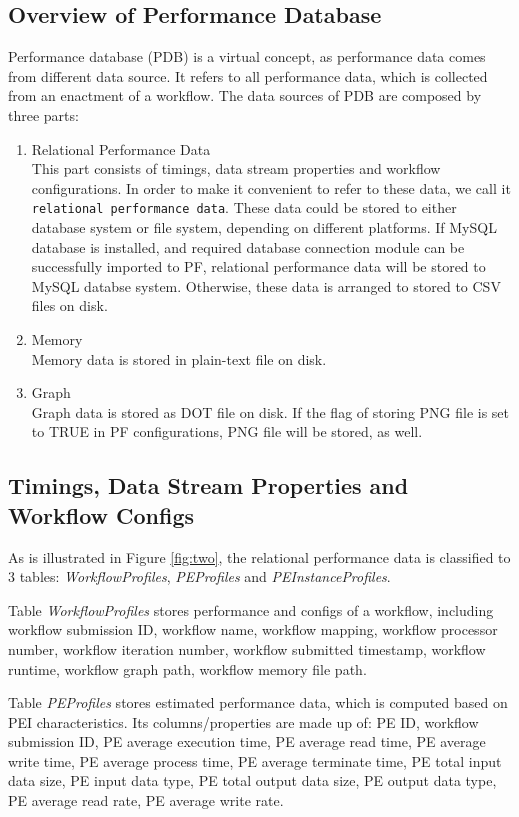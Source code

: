\documentclass[10pt,twoside,openright,logo]{report}
\begin{document}
\subsection{Overview of Performance Database}
Performance database (PDB) is a virtual concept, as performance data comes from different data source. It refers to all performance data, which is collected from an enactment of a workflow. The data sources of PDB are composed by three parts:
\begin{enumerate}
    \item Relational Performance Data\\
    This part consists of timings, data stream properties and workflow configurations. In order to make it convenient to refer to these data, we call it \texttt{relational performance data}. These data could be stored to either database system or file system, depending on different platforms.
    If MySQL database is installed, and required database connection module can be successfully imported to PF, relational performance data will be stored to MySQL databse system.
    Otherwise, these data is arranged to stored to CSV files on disk.
    \item Memory\\
    Memory data is stored in plain-text file on disk.
    \item Graph\\
    Graph data is stored as DOT file on disk. If the flag of storing PNG file is set to TRUE in PF configurations, PNG file will be stored, as well.
\end{enumerate}

\subsection{Timings, Data Stream Properties and Workflow Configs}
\figtwo
As is illustrated in Figure \ref{fig:two}, the relational performance data is classified to 3 tables: \textit{WorkflowProfiles}, \textit{PEProfiles} and \textit{PEInstanceProfiles}.

Table \textit{WorkflowProfiles} stores performance and configs of a workflow, including workflow submission ID, workflow name, workflow mapping, workflow processor number, workflow iteration number, workflow submitted timestamp, workflow runtime, workflow graph path, workflow memory file path.

Table \textit{PEProfiles} stores estimated performance data, which is computed based on PEI characteristics. Its columns/properties are made up of: PE ID, workflow submission ID, PE average execution time, PE average read time, PE average write time, PE average process time, PE average terminate time, PE total input data size, PE input data type, PE total output data size, PE output data type, PE average read rate, PE average write rate.
\end{document}
